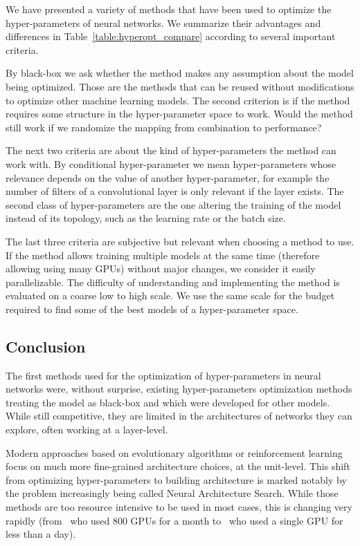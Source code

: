 We have presented a variety of methods that have been used to optimize the hyper-parameters of neural networks. We summarize their advantages and differences in Table~\ref{table:hyperopt_compare} according to several important criteria.

By black-box we ask whether the method makes any assumption about the model being optimized. Those are the methods that can be reused without modifications to optimize other machine learning models. The second criterion is if the method requires some structure in the hyper-parameter space to work. Would the method still work if we randomize the mapping from combination to performance? 

The next two criteria are about the kind of hyper-parameters the method can work with. By conditional hyper-parameter we mean hyper-parameters whose relevance depends on the value of another hyper-parameter, for example the number of filters of a convolutional layer is only relevant if the layer exists. The second class of hyper-parameters are the one altering the training of the model instead of its topology, such as the learning rate or the batch size. 

The last three criteria are subjective but relevant when choosing a method to use. If the method allows training multiple models at the same time (therefore allowing using many GPUs) without major changes, we consider it easily parallelizable. The difficulty of understanding and implementing the method is evaluated on a coarse low to high scale. We use the same scale for the budget required to find some of the best models of a hyper-parameter space.

\subsection{Conclusion}

The first methods used for the optimization of hyper-parameters in neural networks were, without surprise, existing hyper-parameters optimization methods treating the model as black-box and which were developed for other models. While still competitive, they are limited in the architectures of networks they can explore, often working at a layer-level. 

Modern approaches based on evolutionary algorithms or reinforcement learning focus on much more fine-grained architecture choices, at the unit-level. This shift from optimizing hyper-parameters to building architecture is marked notably by the problem increasingly being called Neural Architecture Search. While those methods are too resource intensive to be used in most cases, this is changing very rapidly (from~\textcite{zoph2017ICLR} who used 800 GPUs for a month to~\textcite{pham2018ICML} who used a single GPU for less than a day). 

